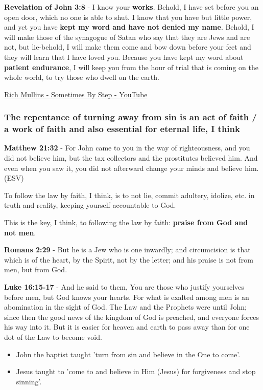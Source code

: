 \documentclass[11pt]{article}
\begin{document}
\textbf{Revelation of John 3:8} - I know your \textbf{works}. Behold, I have set before you an open door, which no one is able to shut. I know that you have but little power, and yet you have \textbf{kept my word and have not denied my name}. Behold, I will make those of the synagogue of Satan who say that they are Jews and are not, but lie-behold, I will make them come and bow down before your feet and they will learn that I have loved you. Because you have kept my word about \textbf{patient endurance}, I will keep you from the hour of trial that is coming on the whole world, to try those who dwell on the earth.

\href{https://www.youtube.com/watch?v=GamlYvhJyiM}{Rich Mullins - Sometimes By Step - YouTube}

\subsubsection{The repentance of turning away from sin is an act of faith / a work of faith and also essential for eternal life, I think}
\label{sec:orge87ed82}
\textbf{Matthew 21:32} - For John came to you in the way of righteousness, and you did not believe him, but the tax collectors and the prostitutes believed him. And even when you saw it, you did not afterward change your minds and believe him. (ESV)

To follow the law by faith, I think, is to not lie, commit adultery, idolize, etc. in truth and reality, keeping yourself accountable to God.

This is the key, I think, to following the law by faith: \textbf{praise from God and not men}.

\textbf{Romans 2:29} - But he is a Jew who is one inwardly; and circumcision is that which is of the heart, by the Spirit, not by the letter; and his praise is not from men, but from God.

\textbf{Luke 16:15-17} - And he said to them, You are those who justify yourselves before men, but God knows your hearts. For what is exalted among men is an abomination in the sight of God.  The Law and the Prophets were until John; since then the good news of the kingdom of God is preached, and everyone forces his way into it.  But it is easier for heaven and earth to pass away than for one dot of the Law to become void.

\begin{itemize}
\item John the baptist taught 'turn from sin and believe in the One to come'.
\item Jesus taught to 'come to and believe in Him (Jesus) for forgiveness and stop sinning'.
\end{itemize}
\end{document}
